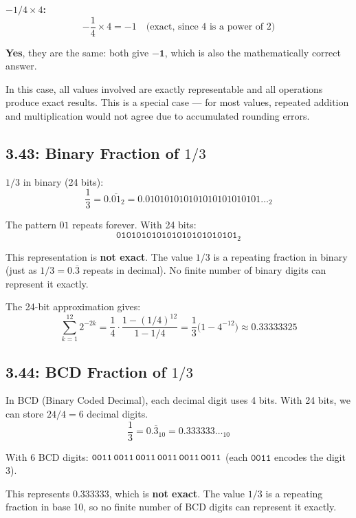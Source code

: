 \noindent\textbf{$-1/4 \times 4$:}
\[
  -\frac{1}{4} \times 4 = -1 \quad\text{(exact, since 4 is a power of 2)}
\]

\textbf{Yes}, they are the same: both give $\mathbf{-1}$, which is also the
mathematically correct answer.

In this case, all values involved are exactly representable and all operations
produce exact results. This is a special case --- for most values, repeated
addition and multiplication would not agree due to accumulated rounding errors.

\subsection*{3.43: Binary Fraction of $1/3$}
\hypertarget{sol-3.43}{}

$1/3$ in binary (24 bits):
\[
  \frac{1}{3} = 0.\overline{01}_2 = 0.010101010101010101010101\ldots_2
\]

The pattern $01$ repeats forever. With 24 bits:
\[
  \texttt{010101010101010101010101}_2
\]

This representation is \textbf{not exact}. The value $1/3$ is a repeating
fraction in binary (just as $1/3 = 0.\overline{3}$ repeats in decimal). No
finite number of binary digits can represent it exactly.

The 24-bit approximation gives:
\[
  \sum_{k=1}^{12} 2^{-2k}
  = \frac{1}{4}\cdot\frac{1-(1/4)^{12}}{1-1/4}
  = \frac{1}{3}\bigl(1 - 4^{-12}\bigr)
  \approx 0.33333325
\]

\subsection*{3.44: BCD Fraction of $1/3$}
\hypertarget{sol-3.44}{}

In BCD (Binary Coded Decimal), each decimal digit uses 4 bits. With 24 bits,
we can store $24/4 = 6$ decimal digits.
\[
  \frac{1}{3} = 0.\overline{3}_{10} = 0.333333\ldots_{10}
\]

With 6 BCD digits: $\texttt{0011\,0011\,0011\,0011\,0011\,0011}$ (each
$\texttt{0011}$ encodes the digit 3).

This represents $0.333333$, which is \textbf{not exact}. The value $1/3$ is a
repeating fraction in base 10, so no finite number of BCD digits can represent
it exactly.

